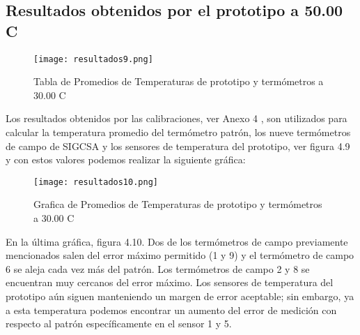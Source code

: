 \subsection{Resultados obtenidos por el prototipo a 50.00 C}

\begin{figure}[H]
	\centering
	\texttt{[image: resultados9.png]}
	\caption{Tabla de Promedios de Temperaturas de prototipo y termómetros a 30.00 C}
\end{figure}

\par \noindent 
Los resultados obtenidos por las calibraciones, ver Anexo 4 , son utilizados para calcular la temperatura promedio del termómetro patrón, los nueve termómetros de campo de SIGCSA y los sensores de temperatura del prototipo, ver figura 4.9 y con estos valores podemos realizar la siguiente gráfica:

\begin{figure}[H]
	\centering
	\texttt{[image: resultados10.png]}
	\caption{Grafica de Promedios de Temperaturas de prototipo y termómetros a 30.00 C}
\end{figure}

\par \noindent
En la última gráfica, figura 4.10. Dos de los termómetros de campo previamente mencionados salen del error máximo permitido (1 y 9) y el termómetro de campo 6 se aleja cada vez más del patrón. Los termómetros de campo 2 y 8 se encuentran muy cercanos del error máximo. Los sensores de temperatura del prototipo aún siguen manteniendo un margen de error aceptable; sin embargo, ya a esta temperatura podemos encontrar un aumento del error de medición con respecto al patrón específicamente en el sensor 1 y 5.
